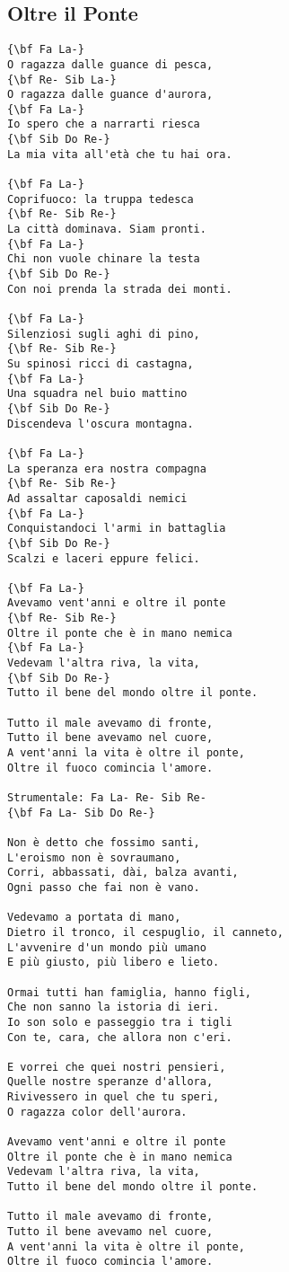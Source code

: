\documentclass[a4paper]{article}
\begin{document}
\subsection{Oltre il Ponte} %
\label{sub:Oltre il Po}
\begin{multicols}{2}
\begin{Verbatim}[commandchars=\\\{\}]
{\bf Fa La-}
O ragazza dalle guance di pesca,
{\bf Re- Sib La-}
O ragazza dalle guance d'aurora,
{\bf Fa La-}
Io spero che a narrarti riesca
{\bf Sib Do Re-}
La mia vita all'età che tu hai ora.

{\bf Fa La-}
Coprifuoco: la truppa tedesca
{\bf Re- Sib Re-}
La città dominava. Siam pronti.
{\bf Fa La-}
Chi non vuole chinare la testa
{\bf Sib Do Re-}
Con noi prenda la strada dei monti.

{\bf Fa La-}
Silenziosi sugli aghi di pino,
{\bf Re- Sib Re-}
Su spinosi ricci di castagna,
{\bf Fa La-}
Una squadra nel buio mattino
{\bf Sib Do Re-}
Discendeva l'oscura montagna.

{\bf Fa La-}
La speranza era nostra compagna
{\bf Re- Sib Re-}
Ad assaltar caposaldi nemici
{\bf Fa La-}
Conquistandoci l'armi in battaglia
{\bf Sib Do Re-}
Scalzi e laceri eppure felici.

{\bf Fa La-}
Avevamo vent'anni e oltre il ponte
{\bf Re- Sib Re-}
Oltre il ponte che è in mano nemica
{\bf Fa La-}
Vedevam l'altra riva, la vita,
{\bf Sib Do Re-}
Tutto il bene del mondo oltre il ponte.

Tutto il male avevamo di fronte,
Tutto il bene avevamo nel cuore,
A vent'anni la vita è oltre il ponte,
Oltre il fuoco comincia l'amore.

Strumentale: Fa La- Re- Sib Re-
{\bf Fa La- Sib Do Re-}

Non è detto che fossimo santi,
L'eroismo non è sovraumano,
Corri, abbassati, dài, balza avanti,
Ogni passo che fai non è vano.

Vedevamo a portata di mano,
Dietro il tronco, il cespuglio, il canneto,
L'avvenire d'un mondo più umano
E più giusto, più libero e lieto.

Ormai tutti han famiglia, hanno figli,
Che non sanno la istoria di ieri.
Io son solo e passeggio tra i tigli
Con te, cara, che allora non c'eri.

E vorrei che quei nostri pensieri,
Quelle nostre speranze d'allora,
Rivivessero in quel che tu speri,
O ragazza color dell'aurora.

Avevamo vent'anni e oltre il ponte
Oltre il ponte che è in mano nemica
Vedevam l'altra riva, la vita,
Tutto il bene del mondo oltre il ponte.

Tutto il male avevamo di fronte,
Tutto il bene avevamo nel cuore,
A vent'anni la vita è oltre il ponte,
Oltre il fuoco comincia l'amore.
\end{Verbatim}
\end{multicols}
\newpage
\end{document}
